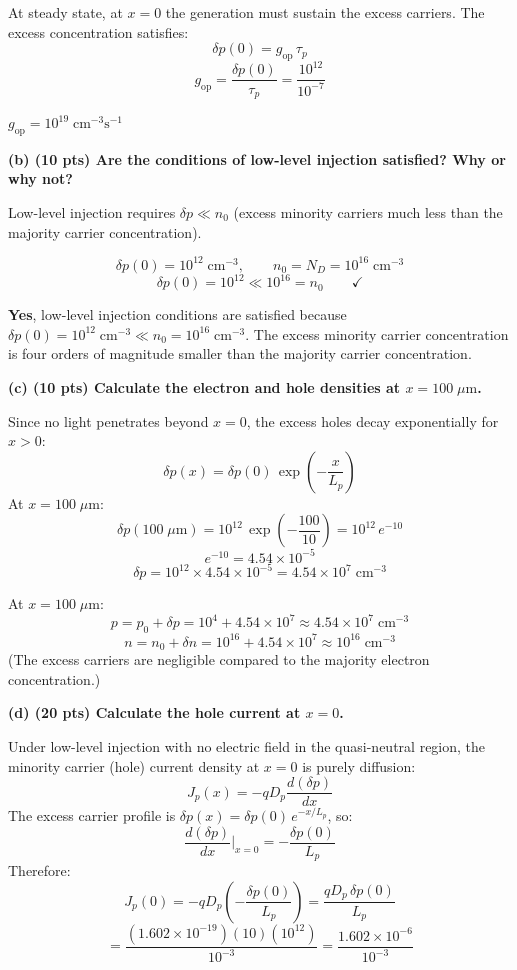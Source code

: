 \documentclass[11pt]{article}
\begin{document}
At steady state, at $x = 0$ the generation must sustain the excess carriers. The excess concentration satisfies:
\[
  \delta p(0) = g_{\text{op}} \, \tau_p
\]
\[
  g_{\text{op}} = \frac{\delta p(0)}{\tau_p} = \frac{10^{12}}{10^{-7}}
\]

\begin{answerbox}
  $g_{\text{op}} = 10^{19}\;\text{cm}^{-3}\text{s}^{-1}$
\end{answerbox}

\textbf{(b) (10 pts) Are the conditions of low-level injection satisfied? Why or why not?}

Low-level injection requires $\delta p \ll n_0$ (excess minority carriers much less than the majority carrier concentration).

\[
  \delta p(0) = 10^{12}\;\text{cm}^{-3}, \qquad n_0 = N_D = 10^{16}\;\text{cm}^{-3}
\]
\[
  \delta p(0) = 10^{12} \ll 10^{16} = n_0 \qquad \checkmark
\]

\begin{answerbox}
  \textbf{Yes}, low-level injection conditions are satisfied because $\delta p(0) = 10^{12}\;\text{cm}^{-3} \ll n_0 = 10^{16}\;\text{cm}^{-3}$. The excess minority carrier concentration is four orders of magnitude smaller than the majority carrier concentration.
\end{answerbox}

\textbf{(c) (10 pts) Calculate the electron and hole densities at $x = 100\;\mu\text{m}$.}

Since no light penetrates beyond $x = 0$, the excess holes decay exponentially for $x > 0$:
\[
  \delta p(x) = \delta p(0)\,\exp\!\left(-\frac{x}{L_p}\right)
\]
At $x = 100\;\mu\text{m}$:
\[
  \delta p(100\;\mu\text{m}) = 10^{12}\,\exp\!\left(-\frac{100}{10}\right) = 10^{12}\,e^{-10}
\]
\[
  e^{-10} = 4.54 \times 10^{-5}
\]
\[
  \delta p = 10^{12} \times 4.54 \times 10^{-5} = 4.54 \times 10^{7}\;\text{cm}^{-3}
\]

\begin{answerbox}
  At $x = 100\;\mu\text{m}$:
  \[
    p = p_0 + \delta p = 10^4 + 4.54 \times 10^7 \approx 4.54 \times 10^7\;\text{cm}^{-3}
  \]
  \[
    n = n_0 + \delta n = 10^{16} + 4.54 \times 10^7 \approx 10^{16}\;\text{cm}^{-3}
  \]
  (The excess carriers are negligible compared to the majority electron concentration.)
\end{answerbox}

\textbf{(d) (20 pts) Calculate the hole current at $x = 0$.}

Under low-level injection with no electric field in the quasi-neutral region, the minority carrier (hole) current density at $x = 0$ is purely diffusion:
\[
  J_p(x) = -qD_p \frac{d(\delta p)}{dx}
\]
The excess carrier profile is $\delta p(x) = \delta p(0)\,e^{-x/L_p}$, so:
\[
  \frac{d(\delta p)}{dx}\bigg|_{x=0} = -\frac{\delta p(0)}{L_p}
\]
Therefore:
\[
  J_p(0) = -qD_p\left(-\frac{\delta p(0)}{L_p}\right) = \frac{qD_p\,\delta p(0)}{L_p}
\]
\[
  = \frac{(1.602 \times 10^{-19})(10)(10^{12})}{10^{-3}}
  = \frac{1.602 \times 10^{-6}}{10^{-3}}
\]
\end{document}
